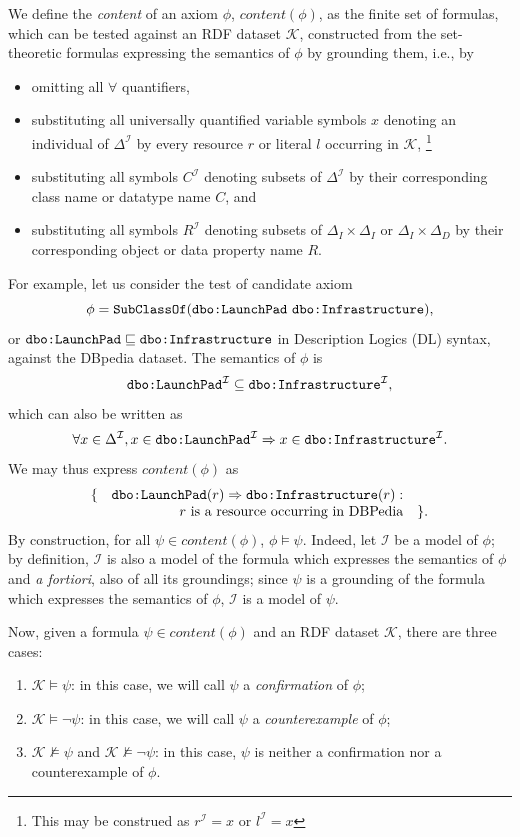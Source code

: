 \documentclass{sig-alternate}
\begin{document}
We define the \emph{content} of an axiom $\phi$, $content(\phi)$, as the finite set of formulas,
which can be tested against an RDF dataset $\mathcal{K}$,
constructed from the set-theoretic formulas expressing the semantics of $\phi$
by grounding them, i.e., by
\begin{itemize}
\item omitting all $\forall$ quantifiers,
\item substituting all universally quantified variable symbols $x$ denoting an individual
of $\Delta^\mathcal{I}$ by every resource $r$ or literal $l$ occurring in $\mathcal{K}$,%
\footnote{This may be construed as $r^\mathcal{I} = x$ or $l^\mathcal{I} = x$}
\item substituting all symbols $C^\mathcal{I}$ denoting subsets of $\Delta^\mathcal{I}$
by their corresponding class name or datatype name $C$, and
\item substituting all symbols $R^\mathcal{I}$ denoting subsets of $\Delta_{I}\times\Delta_{I}$ or $\Delta_{I}\times\Delta_{D}$
by their corresponding object or data property name $R$.
\end{itemize}
For example, let us consider the test of candidate axiom
\[
  \phi = \mbox{\texttt{SubClassOf}(\texttt{dbo:LaunchPad} \texttt{dbo:Infrastructure})},
\]
or $\mbox{\tt dbo:LaunchPad} \sqsubseteq \mbox{\tt dbo:Infrastructure}$
in Description Logics (DL) syntax, against the DBpedia dataset.
The semantics of $\phi$ is
\[
  \mbox{\texttt{dbo:LaunchPad}}^\mathcal{I} \subseteq \mbox{\texttt{dbo:Infrastructure}}^\mathcal{I},
\]
which can also be written as
\[
  \forall x \in \Delta^\mathcal{I},
  x \in \mbox{\texttt{dbo:LaunchPad}}^\mathcal{I} \Rightarrow x \in \mbox{\texttt{dbo:Infrastructure}}^\mathcal{I}.
\]
We may thus express $content(\phi)$ as
\[
  \begin{array}{rrl}
    \{ & \mbox{\tt dbo:LaunchPad}(r) \Rightarrow \mbox{\tt dbo:Infrastructure}(r) : &\\
       & \mbox{$r$ is a resource occurring in DBPedia} & \}.
  \end{array}
\]
By construction, for all $\psi \in content(\phi)$, $\phi \models \psi$.
Indeed, let $\mathcal{I}$ be a model of $\phi$;
by definition, $\mathcal{I}$ is also a model of the formula which expresses the semantics of $\phi$
and \emph{a fortiori}, also of all its groundings; since $\psi$ is a grounding of the
formula which expresses the semantics of $\phi$, $\mathcal{I}$ is a model of $\psi$.

Now, given a formula $\psi \in content(\phi)$ and an RDF dataset $\mathcal{K}$,
there are three cases:
\begin{enumerate}
\item $\mathcal{K} \models \psi$:
  in this case, we will call $\psi$ a \emph{confirmation} of $\phi$;
\item $\mathcal{K} \models \neg\psi$:
  in this case, we will call $\psi$ a \emph{counterexample} of $\phi$;
\item $\mathcal{K} \not\models \psi$ and $\mathcal{K} \not\models \neg\psi$:
  in this case, $\psi$ is neither a confirmation nor a counterexample of $\phi$.
\end{enumerate}
\end{document}
